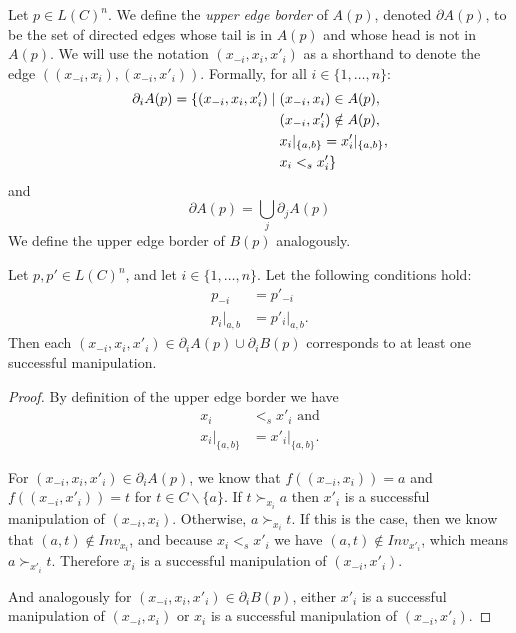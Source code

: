	\begin{definition}
		Let $p \in L(C)^n$. We define the \emph{upper edge border} of $A(p)$, denoted $\partial A(p)$, to be the set of directed edges whose tail is in $A(p)$ and whose head is not in $A(p)$. We will use the notation $(x_{-i}, x_i, x'_i)$ as a shorthand to denote the edge $((x_{-i},x_i), (x_{-i},x'_i))$. Formally, for all $i \in \{1, \ldots, n\}$:
			\begin{align*}
				\partial_i A(p) = \{ (x_{-i}, x_i, x'_i) \mid \hspace{1mm} & (x_{-i}, x_i) \in A(p), \\
				& (x_{-i}, x'_i) \notin A(p), \\
				& x_i|_{\{a,b\}} = x'_i|_{\{a,b\}}, \\
				& x_i <_s x'_i \}
			\end{align*}
		and
			\[
				\partial A(p) = \bigcup_j \partial_j A(p)
			\]
		We define the upper edge border of $B(p)$ analogously.
	\end{definition}

	\begin{lemma}
		\label{manipulation-per-edge-in-a}
		Let $p, p' \in L(C)^n$, and let $i \in \{1, \ldots, n\}$. Let the following conditions hold:
		\begin{align*}
			p_{-i} &= p'_{-i} \\
			p_i|_{a,b} &= p'_i|_{a,b}.
		\end{align*}
		Then each $(x_{-i}, x_i, x'_i) \in \partial_i A(p) \cup \partial_i B(p)$ corresponds to at least one successful manipulation.
	\end{lemma}

	\begin{proof}
		By definition of the upper edge border we have
		\begin{align*}
			x_i &<_s x'_i \text{ and} \\
			x_i|_{\{a,b\}} &= x'_i|_{\{a,b\}}.
		\end{align*}

		For $(x_{-i}, x_i, x'_i) \in \partial_i A(p)$, we know that $f((x_{-i}, x_i)) = a$ and $f((x_{-i}, x'_i)) = t$ for $t \in C \backslash \{a\}$. If $t \succ_{x_i} a$ then $x'_i$ is a successful manipulation of $(x_{-i}, x_i)$. Otherwise, $a \succ_{x_i} t$. If this is the case, then we know that $(a, t) \notin Inv_{x_i}$, and because $x_i <_s x'_i$ we have $(a, t) \notin Inv_{x'_i}$, which means $a \succ_{x'_i} t$. Therefore $x_i$ is a successful manipulation of $(x_{-i}, x'_i)$.

		And analogously for $(x_{-i}, x_i, x'_i) \in \partial_i B(p)$, either $x'_i$ is a successful manipulation of $(x_{-i}, x_i)$ or $x_i$ is a successful manipulation of $(x_{-i}, x'_i)$.
	\end{proof}

